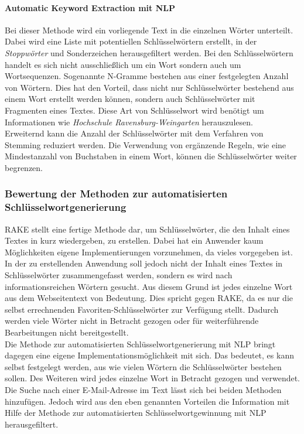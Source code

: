 			\paragraph{Automatic Keyword Extraction mit NLP}
			Bei dieser Methode wird ein vorliegende Text in die einzelnen Wörter unterteilt. Dabei wird eine Liste mit potentiellen Schlüsselwörtern erstellt, in der \textit{Stoppwörter} und Sonderzeichen herausgefiltert werden. Bei den Schlüsselwörtern handelt es sich nicht ausschließlich um ein Wort sondern auch um Wortsequenzen. Sogenannte N-Gramme bestehen aus einer festgelegten Anzahl von Wörtern. Dies hat den Vorteil, dass nicht nur Schlüsselwörter bestehend aus einem Wort erstellt werden können, sondern auch Schlüsselwörter mit Fragmenten eines Textes. Diese Art von Schlüsselwort wird benötigt um Informationen wie \textit{Hochschule Ravensburg-Weingarten} herauszulesen.\\
			Erweiternd kann die Anzahl der Schlüsselwörter mit dem Verfahren von Stemming reduziert werden. Die Verwendung von ergänzende Regeln, wie eine Mindestanzahl von Buchstaben in einem Wort, können die Schlüsselwörter weiter begrenzen.
	
		\subsubsection{Bewertung der Methoden zur automatisierten Schlüsselwortgenerierung}
		RAKE stellt eine fertige Methode dar, um Schlüsselwörter, die den Inhalt eines Textes in kurz wiedergeben, zu erstellen. Dabei hat ein Anwender kaum Möglichkeiten eigene Implementierungen vorzunehmen, da vieles vorgegeben ist. In der zu erstellenden Anwendung soll jedoch nicht der Inhalt eines Textes in Schlüsselwörter zusammengefasst werden, sondern es wird nach informationsreichen Wörtern gesucht. Aus diesem Grund ist jedes einzelne Wort aus dem Webseitentext von Bedeutung. Dies spricht gegen RAKE, da es nur die selbst errechnenden Favoriten-Schlüsselwörter zur Verfügung stellt. Dadurch werden viele Wörter nicht in Betracht gezogen oder für weiterführende Bearbeitungen nicht bereitgestellt.\\
		Die Methode zur automatisierten Schlüsselwortgenerierung mit NLP bringt dagegen eine eigene Implementationsmöglichkeit mit sich. Das bedeutet, es kann selbst festgelegt werden, aus wie vielen Wörtern die Schlüsselwörter bestehen sollen. Des Weiteren wird jedes einzelne Wort in Betracht gezogen und verwendet.\\ Die Suche nach einer E-Mail-Adresse im Text lässt sich bei beiden Methoden hinzufügen. Jedoch wird aus den eben genannten Vorteilen die Information mit Hilfe der Methode zur automatisierten Schlüsselwortgewinnung mit NLP herausgefiltert.
		
